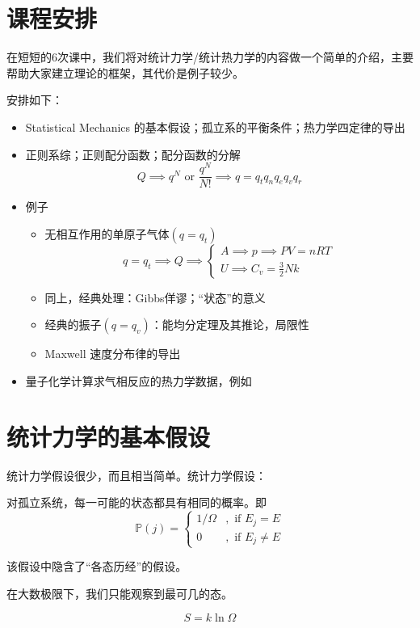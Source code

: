 \chapter*{课程安排}

在短短的6次课中，我们将对统计力学/统计热力学的内容做一个简单的介绍，主要帮助大家建立理论的框架，其代价是例子较少。

安排如下：
\begin{itemize}
    \item Statistical Mechanics 的基本假设；孤立系的平衡条件；热力学四定律的导出
    \item 正则系综；正则配分函数；配分函数的分解
          \begin{equation*}
              Q \implies q^N \text{ or } \frac{q^N}{N!} \implies q = q_t q_n q_e q_v q_r
          \end{equation*}
    \item 例子
          \begin{itemize}
              \item 无相互作用的单原子气体$(q=q_t)$
                    \begin{equation*}
                        q=q_t \implies Q \implies 
                            \begin{cases}
                                A \implies p \implies PV=nRT \\
                                U \implies C_v = \frac{3}{2}Nk
                            \end{cases}
                    \end{equation*}
              \item 同上，经典处理：Gibbs佯谬；“状态”的意义
              \item 经典的振子$(q=q_v)$：能均分定理及其推论，局限性
              \item Maxwell 速度分布律的导出
          \end{itemize}
    \item 量子化学计算求气相反应的热力学数据，例如
\end{itemize}



\chapter{统计力学的基本假设}
统计力学假设很少，而且相当简单。统计力学假设：


\begin{postulate}
对孤立系统，每一可能的状态都具有相同的概率。即
\begin{equation}
    \mathbb{P}(j) = \left\{
        \begin{aligned}
            1/\Omega &, \text{ if } E_j = E \\
            0 &, \text{ if } E_j \neq E
        \end{aligned}
    \right.
\end{equation}
\end{postulate}

\begin{rek}
    该假设中隐含了“各态历经”的假设。
\end{rek}

\begin{rek}
    在大数极限下，我们只能观察到最可几的态。
\end{rek}

\begin{equation}
    S = k \ln \Omega
\end{equation}